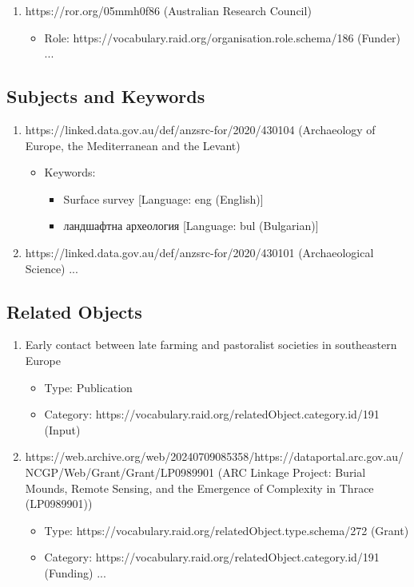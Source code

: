 \begin{framed}
{\begin{enumerate}
\item https://ror.org/05mmh0f86 (Australian Research Council)
   \begin{itemize}
   \item Role: https://vocabulary.raid.org/organisation.role.schema/186 (Funder) ...
   \end{itemize}
\end{enumerate}

\subsection*{Subjects and Keywords}
\begin{enumerate}
\item https://linked.data.gov.au/def/anzsrc-for/2020/430104 (Archaeology of Europe, the Mediterranean and the Levant)
   \begin{itemize}
   \item Keywords:
   \begin{itemize}
   \item Surface survey [Language: eng (English)]
   \item \textrussian{ландшафтна археология} [Language: bul (Bulgarian)]
   \end{itemize}
   \end{itemize}

\item https://linked.data.gov.au/def/anzsrc-for/2020/430101 (Archaeological Science) ...

\end{enumerate}

\subsection*{Related Objects}
\begin{enumerate}
\item Early contact between late farming and pastoralist societies in southeastern Europe
   \begin{itemize}
   \item Type: Publication
   \item Category: https://vocabulary.raid.org/relatedObject.category.id/191 (Input)
   \end{itemize}

\item https://web.archive.org/web/20240709085358/https://dataportal.arc.gov.au/NCGP/Web/Grant/Grant/LP0989901 (ARC Linkage Project: Burial Mounds, Remote Sensing, and the Emergence of Complexity in Thrace (LP0989901))
   \begin{itemize}
   \item Type: https://vocabulary.raid.org/relatedObject.type.schema/272 (Grant)
   \item Category: https://vocabulary.raid.org/relatedObject.category.id/191 (Funding) ...
   \end{itemize}
\end{enumerate}

}
\end{framed}
